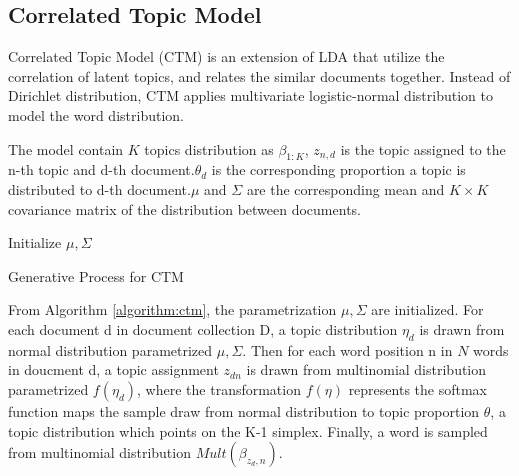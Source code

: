 \subsection{Correlated Topic Model} \label{ch2:ctm}
Correlated Topic Model (CTM)\cite{blei_correlated_2007} is an extension of LDA\cite{blei_latent_2003} that utilize the correlation of latent topics, and relates the similar documents together. Instead of Dirichlet distribution, CTM applies multivariate logistic-normal distribution to model the word distribution.

The model contain $ K $ topics distribution as $ \beta_{1:K} $, $ z_{n,d} $ is the topic assigned to the n-th topic and d-th document.$ \theta_d $ is the corresponding proportion a topic is distributed to d-th document.$ \mu $ and $ \Sigma $ are the corresponding mean and $ K \times K $ covariance matrix of the distribution between documents.\\
\begin{algorithm}[H]
Initialize $ \mu, \Sigma $\\
\label{algorithm:ctm}
\caption{Generative Process for CTM}
\end{algorithm}
From Algorithm \ref{algorithm:ctm}, the parametrization $ \mu, \Sigma $ are initialized. For each document d in document collection D, a topic distribution $ \eta_d $ is drawn from normal distribution parametrized $ \mu,\Sigma $. Then for each word position n in $ N $ words in doucment d, a topic assignment $ z_{dn} $ is drawn from multinomial distribution parametrized $ f(\eta_d) $, where the transformation $ f(\eta) $ represents the softmax function maps the sample draw from normal distribution to topic proportion $ \theta $, a topic distribution which points on the K-1 simplex. Finally, a word is sampled from multinomial distribution $ Mult(\beta_{z_d,n}) $.
